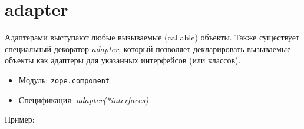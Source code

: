 \documentclass[a4paper,openany,twoside,final]{book}
\providecommand*{\DUroletitlereference}[1]{\textsl{#1}}
\begin{document}
\section*{adapter%
  \label{id55}%
}

Адаптерами выступают любые вызываемые (callable) объекты.  Также
существует специальный декоратор \DUroletitlereference{adapter}, который позволяет
декларировать вызываемые объекты как адаптеры для указанных
интерфейсов (или классов).

\begin{itemize}

\item Модуль: \texttt{zope.component}

\item Спецификация: \DUroletitlereference{adapter(*interfaces)}

\end{itemize}

Пример:
\end{document}
